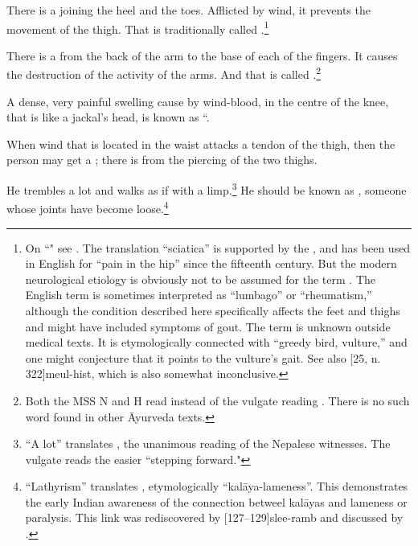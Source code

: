 \begin{translation}
\item [74]

There is a  joining the heel and the toes. 
Afflicted by wind, it prevents the movement of the thigh. That is
traditionally called .\footnote{On
    ``" see \cite[123, n.\,71]{wuja-2003}.  The
    translation ``sciatica'' is supported by the \citet[128]{who-2022},
    and has been used in English for “pain in the hip” since the fifteenth
    century.  But the modern neurological etiology is obviously not to be
    assumed for the term . The English term is sometimes
    interpreted as ``lumbago'' or “rheumatism,'' although the condition
    described here specifically affects the feet and thighs and might have
    included symptoms of gout. The term  is unknown outside
    medical texts.  It is etymologically connected with 
    ``greedy bird, vulture,'' and one might conjecture that it points to
    the vulture's gait.  See also [25, n.\,322]{meul-hist},
    which is also somewhat inconclusive.}


        

\item[75]

There is a  from the back of the arm to the base of each 
of the fingers.  It causes the destruction of the activity of the arms.  And that is 
called .\footnote{Both the MSS N and H read 
 instead of the
	vulgate reading . There is no such word found in other
	Āyurveda texts.}

\item[76]

A dense, very painful swelling cause by wind-blood, in the centre of
the knee, that is like a jackal's head, is known as
“.


\item[77]

When wind that is located in the waist attacks a tendon of the thigh, then 
the person may get a ; there is 
 from the  piercing of the two thighs.

\item[78]

He trembles a lot and walks as if with a limp.\footnote{ “A lot”
    translates , the unanimous reading of the Nepalese
    witnesses.  The vulgate reads the easier 
    “stepping forward."} He should be known as , someone whose joints have become
    loose.\footnote{“Lathyrism” translates ,
        etymologically “\gls{kalāya}-lameness”.  This demonstrates the early
        Indian awareness of the connection betweel \glspl{kalāya} and lameness
        or paralysis.  This link was rediscovered by
        [127--129]{slee-ramb} and discussed by \citet{buch-1904}.}


\end{translation}
